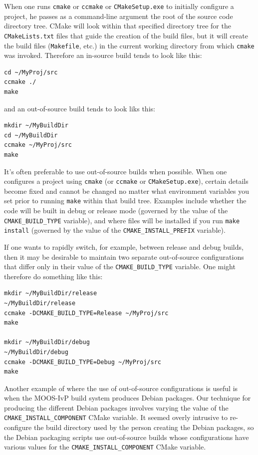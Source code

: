 \documentclass[letterpaper,10pt]{article}
\begin{document}
When one runs \verb|cmake| or \verb|ccmake| or \verb|CMakeSetup.exe| to initially
configure a project, he passes as a command-line argument the root of the source 
code directory tree.  CMake will look within that specified directory tree for
the \verb|CMakeLists.txt| files that guide the creation of the build files, but
it will create the build files (\verb|Makefile|, etc.) in the current working 
directory from which \verb|cmake| was invoked.  Therefore an in-source build
tends to look like this:
\begin{verbatim}
cd ~/MyProj/src
ccmake ./
make
\end{verbatim} 

and an out-of-source build tends to look liks this:
\begin{verbatim}
mkdir ~/MyBuildDir
cd ~/MyBuildDir
ccmake ~/MyProj/src
make
\end{verbatim} 


It's often preferable to use out-of-source builds when possible.  When one
configures a project using \verb|cmake| (or \verb|ccmake| or 
\verb|CMakeSetup.exe|), certain details become fixed and cannot be changed
no matter what environment variables you set prior to running \verb|make|
within that build tree.  Examples include whether the code will be built
in debug or release mode (governed by the value of the \verb|CMAKE_BUILD_TYPE|
variable), and where files will be installed if you run \verb|make install|
(governed by the value of the \verb|CMAKE_INSTALL_PREFIX| variable).  

If one wants to rapidly switch, for example, between release and debug builds,
then it may be desirable to maintain two separate out-of-source configurations
that differ only in their value of the \verb|CMAKE_BUILD_TYPE| variable.  One
might therefore do something like this:

\begin{verbatim}
mkdir ~/MyBuildDir/release
~/MyBuildDir/release
ccmake -DCMAKE_BUILD_TYPE=Release ~/MyProj/src
make

mkdir ~/MyBuildDir/debug
~/MyBuildDir/debug
ccmake -DCMAKE_BUILD_TYPE=Debug ~/MyProj/src
make
\end{verbatim} 


Another example of where the use of out-of-source configurations is useful 
is when the MOOS-IvP build system produces Debian packages.  Our technique
for producing the different Debian packages involves varying the value of
the \verb|CMAKE_INSTALL_COMPONENT| CMake variable.  It seemed overly intrusive
to re-configure the build directory used by the person creating the Debian
packages, so the Debian packaging scripts use out-of-source builds whose
configurations have various values for the \verb|CMAKE_INSTALL_COMPONENT| 
CMake variable.
\end{document}
